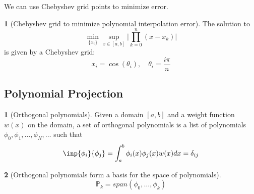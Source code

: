 \documentclass[12pt]{article}
\theoremstyle{definition}
\newtheorem{definition}{\color{NavyBlue}{\textbf{Definition}}}
\newtheorem{theorem}{\color{ForestGreen}{\textbf{Theorem}}}
\theoremstyle{definition}
\begin{document}
We can use Chebyshev grid points to minimize error.
\begin{theorem}[Chebyshev grid to minimize polynomial interpolation error]
	The solution to 
	\begin{equation}
		\min_{\{x_i\}} \sup_{x \in [a,b]} \bigg\lvert \prod_{k=0}^n (x-x_k) \bigg\rvert
	\end{equation}
	is given by a Chebyshev grid:
	\begin{equation}
		x_i = \cos (\theta_i), \quad \theta_i = \frac{i\pi}{n}
	\end{equation}
\end{theorem}
\subsection{Polynomial Projection}

\begin{definition}[Orthogonal polynomials]
	Given a domain $[a,b]$ and a weight function $w(x)$ on the domain, a set of orthogonal polynomials is a list of polynomials $\phi_0, \phi_1, \ldots, \phi_N, \ldots$ such that
	\begin{equation}
		\inp{\phi_i}{\phi_j} = \int_a^b \phi_i(x)\phi_j(x)w(x)dx = \delta_{ij}
	\end{equation}
\end{definition}

\begin{theorem}[Orthogonal polynomials form a basis for the space of polynomials]
	\begin{equation}
		\mathbb{P}_k = span(\phi_0,\ldots,\phi_k)
	\end{equation}
\end{theorem}
\end{document}
